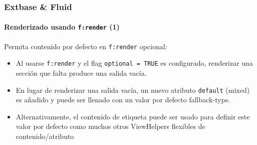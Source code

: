 \begin{frame}[fragile]
	\frametitle{Extbase \& Fluid}
	\framesubtitle{Renderizado usando \texttt{f:render} (1)}

	Permita contenido por defecto en \texttt{f:render} opcional:

	\begin{itemize}

		\item Al usarse \texttt{f:render} y el flag \texttt{optional = TRUE}
			es configurado, renderizar una sección que falta produce una salida vacía.

		\item En lugar de renderizar una salida vacía, un nuevo atributo \texttt{default}
			(mixed) es añadido y puede ser llenado con un valor por defecto fallback-type.

		\item Alternativamente, el contenido de etiqueta puede ser usado para definir este valor por defecto
			como muchos otros ViewHelpers flexibles de contenido/atributo

	\end{itemize}

\end{frame}


